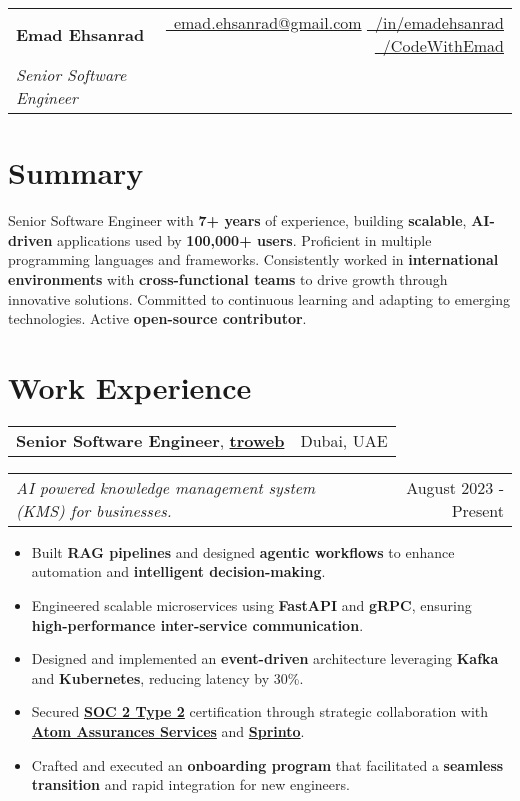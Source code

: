 \documentclass[letterpaper,11pt]{article}
\makeatletter
\newcommand{\resumeFullHeading}[5]{
   \begin{tabular*}{\textwidth}{l@{\extracolsep{\fill}}r}
       \textbf{\Huge #1}\vspace{5px} &
       \small{\href{mailto:#3}{\raisebox{-0.05\height}\faEnvelope \ #3}} \quad
       \small{\href{#4}{\raisebox{-0.05\height}\faLinkedin\ /in/emadehsanrad}} \quad
       \small{\href{#5}{\raisebox{-0.05\height}\faGithub\ /CodeWithEmad}} \\
       \textit{\large #2} & \\
   \end{tabular*}
}
\newcommand{\resumeFullHeadingWithImage}[7]{%
    \begin{minipage}[t]{0.7\textwidth}
        \huge\textbf{#1}\\[0.2em]
        \Large\textit{#2}\\[1em]
        \small{#3 #4 #5}
    \end{minipage}%
    \begin{minipage}[t]{0.3\textwidth}
        \raggedleft
        \raisebox{-2cm}[0pt][0pt]{\texttt{[image: \#6]}}
    \end{minipage}
}
\newcommand{\resumeItemSimple}[1]{
  \item\small{
    {#1}
  }
}
\newcommand{\resumeSubheadingSimple}[5]{
    \begin{tabular*}{1\textwidth}[t]{l@{\extracolsep{\fill}}r}
      \textbf{#1}, \textbf{\href{#3}{#2}} \space \small#4 & \small#5 \\
    \end{tabular*}
}
\newcommand{\resumeSubSubheading}[2]{
    \begin{tabular*}{1\textwidth}{l@{\extracolsep{\fill}}r}
      \textit{\small#1} & \small #2 \\
    \end{tabular*}\vspace{-1pt}
}
\newcommand{\resumeItemListStart}{\begin{itemize}[leftmargin=0.5cm, itemsep=1pt, parsep=0pt]} %
\newcommand{\resumeItemListEnd}{\end{itemize}}
\makeatother
\begin{document}
\resumeFullHeading
  {Emad Ehsanrad}
  {Senior Software Engineer}
  {emad.ehsanrad@gmail.com}
  {https://www.linkedin.com/in/emadehsanrad/}
  {https://github.com/codewithemad}


\section{Summary}
\small
Senior Software Engineer with \textbf{7+ years} of experience, building \textbf{scalable}, \textbf{AI-driven}
applications used by \textbf{100,000+ users}. Proficient in multiple programming languages and frameworks.
Consistently worked in \textbf{international environments} with \textbf{cross-functional teams}
to drive growth through innovative solutions. Committed to continuous learning
and adapting to emerging technologies. Active \textbf{open-source contributor}.

\section{Work Experience}

    \resumeSubheadingSimple
      {Senior Software Engineer}{troweb}{https://www.linkedin.com/company/troweb/}{}{Dubai, UAE}
      \resumeSubSubheading{AI powered knowledge management system (KMS) for businesses.}{August 2023 - Present}
      \resumeItemListStart
        \resumeItemSimple{Built \textbf{RAG pipelines} and designed \textbf{agentic workflows} to enhance automation and \textbf{intelligent decision-making}.}
        \resumeItemSimple{Engineered scalable microservices using \textbf{FastAPI} and \textbf{gRPC}, ensuring \textbf{high-performance inter-service communication}.}
        \resumeItemSimple{Designed and implemented an \textbf{event-driven} architecture leveraging \textbf{Kafka} and \textbf{Kubernetes}, reducing latency by 30\%.}
        \resumeItemSimple{Secured \href{https://sprinto.com/blog/soc-2-type-2/}{\textbf{SOC 2 Type 2}} certification through strategic collaboration with \textbf{\href{https://www.linkedin.com/company/atom-assurances-services/}{Atom Assurances Services}} and \textbf{\href{https://www.linkedin.com/company/sprinto-com/}{Sprinto}}.}
        \resumeItemSimple{Crafted and executed an \textbf{onboarding program}  that facilitated a \textbf{seamless transition} and rapid integration for new engineers.}
      \resumeItemListEnd
\end{document}
